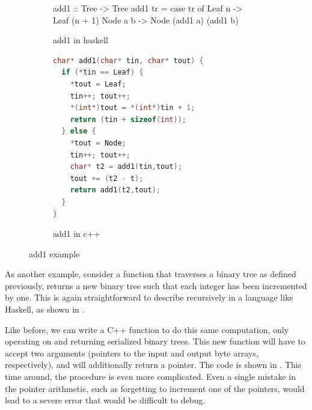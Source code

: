 \begin{figure}
  \begin{subfigure}{\textwidth}
\begin{code}
add1 :: Tree -> Tree
add1 tr =
  case tr of
    Leaf n -> Leaf (n + 1)
    Node a b -> Node (add1 a) (add1 b)
\end{code}
    \caption{add1 in haskell}\label{fig:add1-haskell}
  \end{subfigure}

  \begin{subfigure}{\textwidth}
\begin{lstlisting}[language=C++]
char* add1(char* tin, char* tout) {
  if (*tin == Leaf) {
    *tout = Leaf;
    tin++; tout++;
    *(int*)tout = *(int*)tin + 1;
    return (tin + sizeof(int));
  } else {
    *tout = Node;
    tin++; tout++;
    char* t2 = add1(tin,tout);
    tout += (t2 - t);
    return add1(t2,tout);
  }
}
\end{lstlisting}
    \caption{add1 in c++}\label{fig:add1-cpp}
  \end{subfigure}
\caption{add1 example}
\end{figure}

As another example, consider a function that traverses a binary tree as defined
previously, returns a new binary tree such that each integer has been incremented
by one. This is again straightforward to describe recursively in a language
like Haskell, as shown in .

Like before, we can write a C++ function to do this same computation, only
operating on and returning serialized binary trees. This new function will
have to accept two arguments (pointers to the input and output byte arrays,
respectively), and will additionally return a pointer. The code is shown in
. This time around, the procedure is even more
complicated. Even a single mistake in the pointer arithmetic, such as forgetting
to increment one of the pointers, would lead to a severe error that would
be difficult to debug.


%

